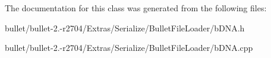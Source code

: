 The documentation for this class was generated from the following files\+:\begin{DoxyCompactItemize}
\item 
bullet/bullet-\/2.-\/r2704/\+Extras/\+Serialize/\+Bullet\+File\+Loader/b\+D\+N\+A.\+h\item 
bullet/bullet-\/2.-\/r2704/\+Extras/\+Serialize/\+Bullet\+File\+Loader/b\+D\+N\+A.\+cpp\end{DoxyCompactItemize}
